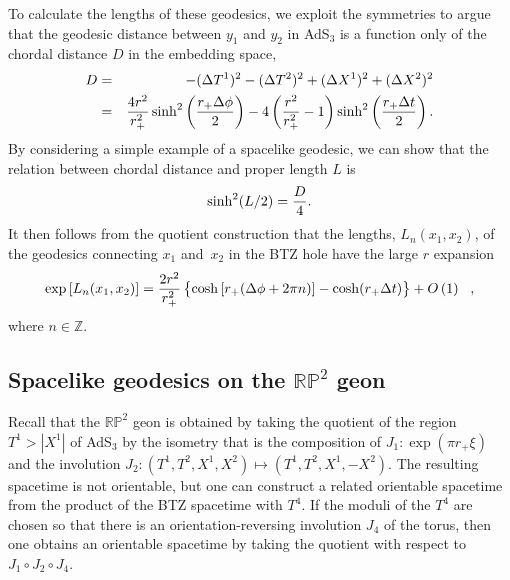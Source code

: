 \documentclass[a4paper,12pt]{article}
\begin{document}
To calculate the lengths of these geodesics, we exploit the
symmetries to argue that the geodesic distance between $y_1$ and 
$y_2$ in AdS$_3$
is a function only of the chordal distance $D$ 
in the embedding space,
\begin{eqnarray}
D &=& - (\Delta T^1)^2 - (\Delta T^2)^2 + (\Delta X^1)^2 + (\Delta
X^2)^2 \nonumber \\
&=& { 4r^2 \over r_+^2} \sinh^2 \left( {r_+ \Delta \phi \over 2} \right)
- 4 \left({ r^2 \over r_+^2} - 1 \right) \sinh^2 \left( {r_+ \Delta t
\over 2} \right). 
\end{eqnarray}
By considering a simple example of a spacelike geodesic, we can show
that the relation between chordal distance and proper length $L$ is
\begin{equation}
\sinh^2 (L/2) = {D \over 4}.
\end{equation}
It then follows from the 
quotient construction 
that the lengths, $L_n(x_1,x_2)$, of the 
geodesics connecting $x_1$ and~$x_2$ in the BTZ hole 
have the large $r$
expansion
\begin{equation}
\exp\left[L_n(x_1,x_2)\right]
= 
\frac{2 r^2}{r_+^2} 
\left\{
\cosh \left[r_+(\Delta \phi + 2\pi n ) \right] 
- \cosh(r_+\Delta t)
\vphantom{A^A_A}
\right\}
+ O\left( 1 \right) 
\ \ , 
\label{L-expr-BTZ}
\end{equation}
where $n\in{\mathbb Z}$. 


\subsection{Spacelike geodesics on the $\mathbb R \mathbb P^2$ geon}
\label{subsec:geodesics-on-geon}

Recall \cite{louko:geon} that the $\mathbb R \mathbb P^2$ geon is
obtained by taking the quotient of the region $T^1 > |X^1|$ of AdS$_3$
by the isometry that is the composition of $J_1 : \exp(\pi r_+ \xi)$ and
the involution $J_2: (T^1, T^2, X^1, X^2) \mapsto (T^1, T^2, X^1, -
X^2)$.  The resulting spacetime is not orientable, but one can
construct a related orientable spacetime from the product of the BTZ
spacetime with $T^4$.  If the moduli of the $T^4$ are chosen so that
there is an orientation-reversing involution $J_4$ of the torus, then
one obtains an orientable spacetime by taking the quotient with
respect to $J_1 \circ J_2 \circ J_4$.
\end{document}
